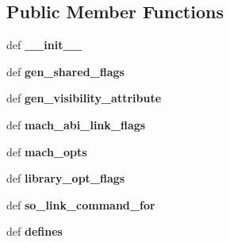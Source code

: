 \subsection*{Public Member Functions}
\begin{DoxyCompactItemize}
\item 
\hypertarget{classconfigure_1_1CompilerInfo_ab8c4a74326b1bbae79dbddc6d552b633}{def {\bfseries \-\_\-\-\_\-init\-\_\-\-\_\-}}\label{classconfigure_1_1CompilerInfo_ab8c4a74326b1bbae79dbddc6d552b633}

\item 
\hypertarget{classconfigure_1_1CompilerInfo_a73ca7b741dc79fbc1a4ff5c9b8793b9a}{def {\bfseries gen\-\_\-shared\-\_\-flags}}\label{classconfigure_1_1CompilerInfo_a73ca7b741dc79fbc1a4ff5c9b8793b9a}

\item 
\hypertarget{classconfigure_1_1CompilerInfo_a837d4907c38cde243ab127793676de6b}{def {\bfseries gen\-\_\-visibility\-\_\-attribute}}\label{classconfigure_1_1CompilerInfo_a837d4907c38cde243ab127793676de6b}

\item 
\hypertarget{classconfigure_1_1CompilerInfo_a920e0ff74cdd7e6a414c5267c89fb580}{def {\bfseries mach\-\_\-abi\-\_\-link\-\_\-flags}}\label{classconfigure_1_1CompilerInfo_a920e0ff74cdd7e6a414c5267c89fb580}

\item 
\hypertarget{classconfigure_1_1CompilerInfo_a6df047dec307ef483f86cd0b183c9da0}{def {\bfseries mach\-\_\-opts}}\label{classconfigure_1_1CompilerInfo_a6df047dec307ef483f86cd0b183c9da0}

\item 
\hypertarget{classconfigure_1_1CompilerInfo_ad5fcfedbf1bcd2af7421fc4ebde50a01}{def {\bfseries library\-\_\-opt\-\_\-flags}}\label{classconfigure_1_1CompilerInfo_ad5fcfedbf1bcd2af7421fc4ebde50a01}

\item 
\hypertarget{classconfigure_1_1CompilerInfo_a070f67f0a630b28a67bd731854fa8722}{def {\bfseries so\-\_\-link\-\_\-command\-\_\-for}}\label{classconfigure_1_1CompilerInfo_a070f67f0a630b28a67bd731854fa8722}

\item 
\hypertarget{classconfigure_1_1CompilerInfo_a85efb6c1e29b0898f01ded5c2133aea9}{def {\bfseries defines}}\label{classconfigure_1_1CompilerInfo_a85efb6c1e29b0898f01ded5c2133aea9}

\end{DoxyCompactItemize}
